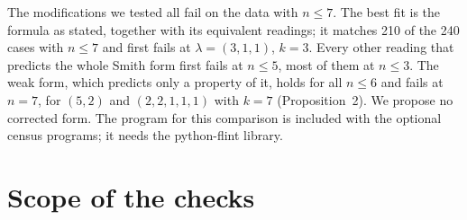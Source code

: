 The modifications we tested all fail on the data with $n\le7$. The best fit is the formula
as stated, together with its equivalent readings; it matches 210 of the 240
cases with $n\le7$ and first fails at $\lambda=(3,1,1)$, $k=3$. Every other
reading that predicts the whole Smith form first fails at $n\le5$, most of
them at $n\le3$. The weak form, which predicts only a property of it, holds
for all $n\le6$ and fails at $n=7$, for $(5,2)$ and $(2,2,1,1,1)$ with $k=7$
(Proposition~2). We propose no corrected form. The program for
this comparison is included with the optional census programs; it needs the
python-flint library.


\section{Scope of the checks}\label{app:checks}

